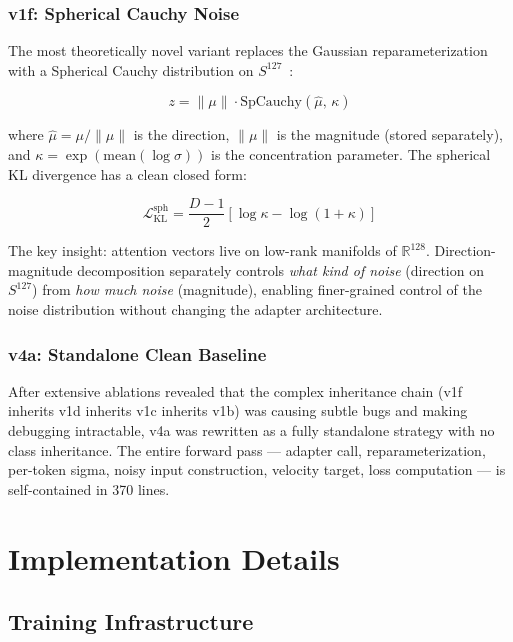 \documentclass[10pt,twocolumn]{article}
\begin{document}
\subsubsection{v1f: Spherical Cauchy Noise}

The most theoretically novel variant replaces the Gaussian reparameterization with a Spherical Cauchy distribution on $S^{127}$~\cite{kato2020}:

\begin{equation}
  z = \|{\mu}\| \cdot \text{SpCauchy}\!\left(\hat{\mu},\, \kappa\right)
\end{equation}

where $\hat{\mu} = \mu / \|\mu\|$ is the direction, $\|\mu\|$ is the magnitude (stored separately), and $\kappa = \exp(\text{mean}(\log\sigma))$ is the concentration parameter. The spherical KL divergence has a clean closed form:

\begin{equation}
  \mathcal{L}_{\text{KL}}^{\text{sph}} = \frac{D-1}{2}\left[\log\kappa - \log(1+\kappa)\right]
\end{equation}

The key insight: attention vectors live on low-rank manifolds of $\mathbb{R}^{128}$. Direction-magnitude decomposition separately controls \emph{what kind of noise} (direction on $S^{127}$) from \emph{how much noise} (magnitude), enabling finer-grained control of the noise distribution without changing the adapter architecture.

\subsubsection{v4a: Standalone Clean Baseline}

After extensive ablations revealed that the complex inheritance chain (v1f inherits v1d inherits v1c inherits v1b) was causing subtle bugs and making debugging intractable, v4a was rewritten as a fully standalone strategy with no class inheritance. The entire forward pass — adapter call, reparameterization, per-token sigma, noisy input construction, velocity target, loss computation — is self-contained in 370 lines.

\section{Implementation Details}
\label{sec:implementation}

\subsection{Training Infrastructure}
\end{document}
